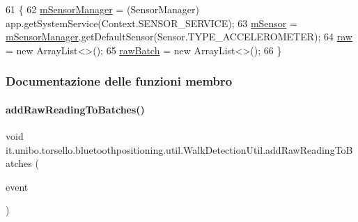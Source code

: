 \begin{DoxyCode}
61                                               \{
62         \hyperlink{classit_1_1unibo_1_1torsello_1_1bluetoothpositioning_1_1util_1_1WalkDetectionUtil_afa8539715b8ef707d07c16e1ff27050d_afa8539715b8ef707d07c16e1ff27050d}{mSensorManager} = (SensorManager) app.getSystemService(Context.SENSOR\_SERVICE);
63         \hyperlink{classit_1_1unibo_1_1torsello_1_1bluetoothpositioning_1_1util_1_1WalkDetectionUtil_a986c50a12f56513e975fc52cadc819af_a986c50a12f56513e975fc52cadc819af}{mSensor} = \hyperlink{classit_1_1unibo_1_1torsello_1_1bluetoothpositioning_1_1util_1_1WalkDetectionUtil_afa8539715b8ef707d07c16e1ff27050d_afa8539715b8ef707d07c16e1ff27050d}{mSensorManager}.getDefaultSensor(Sensor.TYPE\_ACCELEROMETER);
64         \hyperlink{classit_1_1unibo_1_1torsello_1_1bluetoothpositioning_1_1util_1_1WalkDetectionUtil_a985270e2b9d4202985cb987eef136a9e_a985270e2b9d4202985cb987eef136a9e}{raw} = \textcolor{keyword}{new} ArrayList<>();
65         \hyperlink{classit_1_1unibo_1_1torsello_1_1bluetoothpositioning_1_1util_1_1WalkDetectionUtil_a47aa197c142093f82c9f2acefd0a6af3_a47aa197c142093f82c9f2acefd0a6af3}{rawBatch} = \textcolor{keyword}{new} ArrayList<>();
66     \}
\end{DoxyCode}


\subsubsection{Documentazione delle funzioni membro}
\hypertarget{classit_1_1unibo_1_1torsello_1_1bluetoothpositioning_1_1util_1_1WalkDetectionUtil_aaa2fda3fa51154aa22c3d6c4385d08eb_aaa2fda3fa51154aa22c3d6c4385d08eb}{}\label{classit_1_1unibo_1_1torsello_1_1bluetoothpositioning_1_1util_1_1WalkDetectionUtil_aaa2fda3fa51154aa22c3d6c4385d08eb_aaa2fda3fa51154aa22c3d6c4385d08eb} 
\paragraph{\texorpdfstring{add\+Raw\+Reading\+To\+Batches()}{addRawReadingToBatches()}}
{\footnotesize\ttfamily void it.\+unibo.\+torsello.\+bluetoothpositioning.\+util.\+Walk\+Detection\+Util.\+add\+Raw\+Reading\+To\+Batches (\begin{DoxyParamCaption}\item[{Sensor\+Event}]{event }\end{DoxyParamCaption})\hspace{0.3cm}{\ttfamily [private]}}



